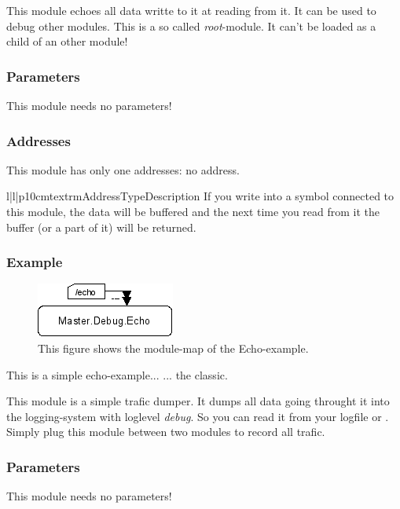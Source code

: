 



%
%
This module echoes all data writte to it at reading from it. It can be used to
debug other modules. This is a so called \emph{root}-module. It can't be 
loaded as a child of an other module!

\subsubsection{Parameters}
This module needs no parameters!

\subsubsection{Addresses}
This module has only one addresses: no address.
\begin{tableiii}{l|l|p{10cm}}{textrm}{Address}{Type}{Description}
\lineiii{---}
        {}
        {If you write into a symbol connected to this module, the data will be
         buffered and the next time you read from it the buffer (or a part of 
         it) will be returned.}
\end{tableiii}

\subsubsection{Example}
\begin{figure}[ht]
    \label{coremod06}
    \centering
    \includegraphics{coremod06.png}
    \caption{This figure shows the module-map of the Echo-example.}
\end{figure}    
This is a simple echo-example... ... the classic.





%
%
This module is a simple trafic dumper. It dumps all data going throught it
into the logging-system with loglevel \emph{debug}. So you can read it from
your logfile or . Simply plug this module between two modules
to record all trafic.

\subsubsection{Parameters}
This module needs no parameters!

